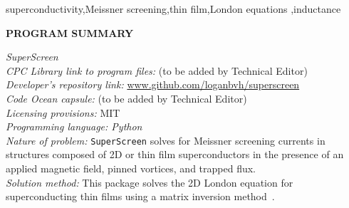 \documentclass[final,3p,times,twocolumn]{elsarticle}
\newcommand{\inline}[1]{\texttt{#1}\xspace}
\newcommand{\SuperScreen}{\inline{SuperScreen}}
\begin{document}
\begin{frontmatter}
\begin{keyword}
superconductivity\sep Meissner screening\sep thin film\sep London equations \sep inductance

\end{keyword}

\end{frontmatter}


\noindent
{\bf PROGRAM SUMMARY}

\begin{small}
\noindent
{\em SuperScreen}\\
{\em CPC Library link to program files:} (to be added by Technical Editor) \\
{\em Developer's repository link:} \href{http://www.github.com/loganbvh/superscreen}{www.github.com/loganbvh/superscreen}\\
{\em Code Ocean capsule:} (to be added by Technical Editor)\\
{\em Licensing provisions:} MIT\\
{\em Programming language: Python}\\
{\em Nature of problem:} \SuperScreen solves for Meissner screening currents in structures composed of 2D or thin film superconductors in the presence of an applied magnetic field, pinned vortices, and trapped flux.\\
{\em Solution method:} This package solves the 2D London equation for superconducting thin films using a matrix inversion method~\cite{Brandt2004-ew,Brandt2005-wj}.\\
   \\


\end{small}
\end{document}
